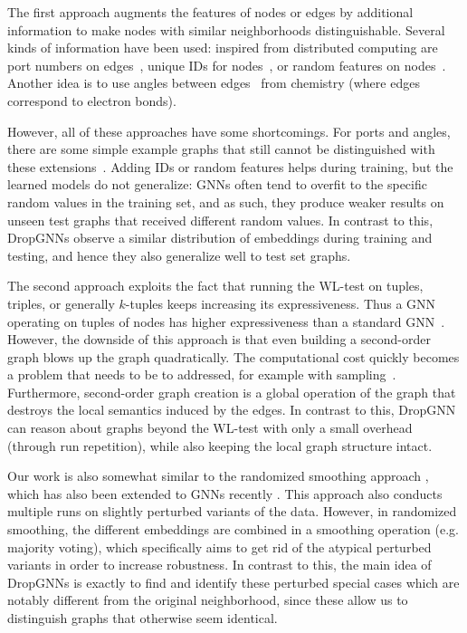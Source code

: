 \documentclass{article}
\begin{document}
The first approach augments the features of nodes or edges by additional information to make nodes with similar neighborhoods distinguishable. Several kinds of information have been used: inspired from distributed computing are port numbers on edges~\citep{ports}, unique IDs for nodes~\citep{loukas2020graph}, or random features on nodes~\citep{randomFeatures1, randomFeatures2}. Another idea is to use angles between edges~\citep{angles} from chemistry (where edges correspond to electron bonds).

However, all of these approaches have some shortcomings. For ports and angles, there are some simple example graphs that still cannot be distinguished with these extensions~\citep{limits}. Adding IDs or random features helps during training, but the learned models do not generalize: GNNs often tend to overfit to the specific random values in the training set, and as such, they produce weaker results on unseen test graphs that received different random values. In contrast to this, DropGNNs observe a similar distribution of embeddings during training and testing, and hence they also generalize well to test set graphs.

The second approach exploits the fact that running the WL-test on tuples, triples, or generally $k$-tuples keeps increasing its expressiveness. Thus a GNN operating on tuples of nodes has higher expressiveness than a standard GNN~\citep{morris2019weisfeiler, maron2019provably}. However, the downside of this approach is that even building a second-order graph blows up the graph quadratically. The computational cost quickly becomes a problem that needs to be to addressed, for example with sampling~\citep{morris2019weisfeiler}. Furthermore, second-order graph creation is a global operation of the graph that destroys the local semantics induced by the edges. In contrast to this, DropGNN can reason about graphs beyond the WL-test with only a small overhead (through run repetition), while also keeping the local graph structure intact.

Our work is also somewhat similar to the randomized smoothing approach \citep{cohen2019certified}, which has also been extended to GNNs recently \citep{bojchevski2020efficient}. This approach also conducts multiple runs on slightly perturbed variants of the data. However, in randomized smoothing, the different embeddings are combined in a smoothing operation (e.g. majority voting), which specifically aims to get rid of the atypical perturbed variants in order to increase robustness. In contrast to this, the main idea of DropGNNs is exactly to find and identify these perturbed special cases which are notably different from the original neighborhood, since these allow us to distinguish graphs that otherwise seem identical.
\end{document}
